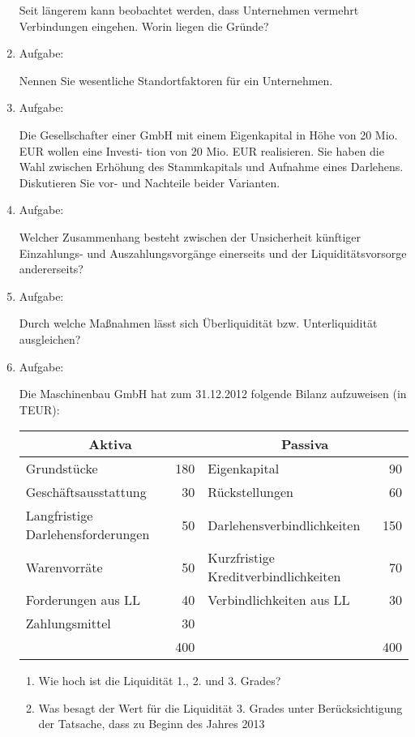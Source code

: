 \documentclass[12pt,a4paper]{scrreprt}
\begin{document}
\begin{enumerate}
Seit längerem kann beobachtet werden, dass Unternehmen vermehrt Verbindungen eingehen. Worin
liegen die Gründe?

 	\item{Aufgabe:}

Nennen Sie wesentliche Standortfaktoren für ein Unternehmen.

 	\item{Aufgabe:}

Die Gesellschafter einer GmbH mit einem Eigenkapital in Höhe von 20 Mio. EUR wollen eine Investi-
tion von 20 Mio. EUR realisieren. Sie haben die Wahl zwischen Erhöhung des Stammkapitals und
Aufnahme eines Darlehens. Diskutieren Sie vor- und Nachteile beider Varianten.

 	\item{Aufgabe:}

Welcher Zusammenhang besteht zwischen der Unsicherheit künftiger Einzahlungs-
und Auszahlungsvorgänge einerseits und der Liquiditätsvorsorge andererseits?

 	\item{Aufgabe:}

Durch welche Maßnahmen lässt sich Überliquidität bzw. Unterliquidität ausgleichen?

 	\item{Aufgabe:}

Die Maschinenbau GmbH hat zum 31.12.2012 folgende Bilanz aufzuweisen (in TEUR):

\begin{tabular}{|lr|lr|}
\hline \multicolumn{2}{|c|}{Aktiva} & \multicolumn{2}{|c|}{Passiva} \\\hline
Grundstücke & 180 & Eigenkapital & 90 \\\hline
Geschäftsausstattung & 30 & Rückstellungen & 60 \\\hline
Langfristige Darlehensforderungen & 50 & Darlehensverbindlichkeiten & 150 \\\hline
Warenvorräte & 50 & Kurzfristige Kreditverbindlichkeiten & 70 \\\hline
Forderungen aus LL & 40 & Verbindlichkeiten aus LL & 30 \\\hline
Zahlungsmittel & 30 &  \multicolumn{2}{|l|}{} \\\hline
 \multicolumn{2}{|r|}{400} & \multicolumn{2}{|r|}{400} \\\hline
\end{tabular}

\begin{enumerate}
\item Wie hoch ist die Liquidität 1., 2. und 3. Grades?
\item Was besagt der Wert für die Liquidität 3. Grades unter Berücksichtigung der Tatsache, dass zu
Beginn des Jahres 2013

\end{enumerate}


\end{enumerate}
\end{document}
